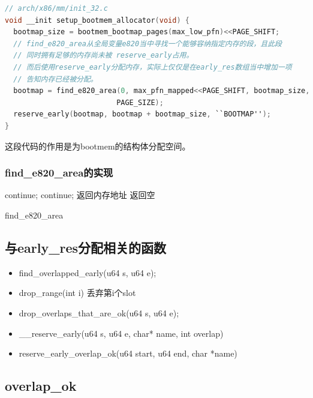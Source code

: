 \documentclass[b5paper,9pt,twoside,openany]{article}
\begin{document}
\begin{lstlisting}[language=C]
// arch/x86/mm/init_32.c
void __init setup_bootmem_allocator(void) {
  bootmap_size = bootmem_bootmap_pages(max_low_pfn)<<PAGE_SHIFT;
  // find_e820_area从全局变量e820当中寻找一个能够容纳指定内存的段，且此段
  // 同时拥有足够的内存尚未被 reserve_early占用。
  // 而后使用reserve_early分配内存，实际上仅仅是在early_res数组当中增加一项
  // 告知内存已经被分配。
  bootmap = find_e820_area(0, max_pfn_mapped<<PAGE_SHIFT, bootmap_size,
                          PAGE_SIZE);
  reserve_early(bootmap, bootmap + bootmap_size, ``BOOTMAP'');
}
\end{lstlisting}
这段代码的作用是为bootmem的结构体分配空间。
\subsubsection{find\_e820\_area的实现}
\begin{algorithm}[H]
\SetAlgoLined
\BlankLine
{} {
   {
    continue;
  }
   {
   continue;
  }
  返回内存地址
}
\BlankLine
返回空

\caption{find\_e820\_area}
\end{algorithm}

\subsection{与early\_res分配相关的函数}
\begin{itemize}
\item find\_overlapped\_early(u64 s, u64 e);
\item drop\_range(int i) 丢弃第i个slot
\item drop\_overlaps\_that\_are\_ok(u64 s, u64 e);
\item \_\_reserve\_early(u64 s, u64 e, char* name, int overlap)
\item reserve\_early\_overlap\_ok(u64 start, u64 end, char *name)
\end{itemize}

\subsection{overlap\_ok}
\end{document}

